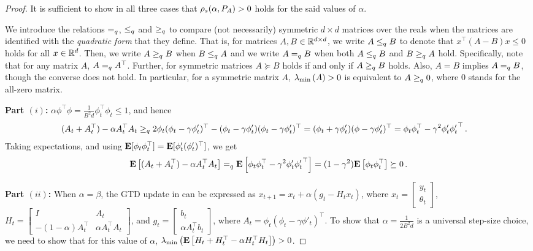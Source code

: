 \thtdadmis*
\begin{proof}
It is sufficient to show in all three cases that $\rho_s(\alpha,P_A)>0$ holds for the said values of $\alpha$. 

We introduce the relations $=_q$, $\leq_q$ and $\geq_q$ to compare (not necessarily) symmetric $d\times d$ matrices
over the reals when the matrices are identified with the \emph{quadratic form} that they define.
That is, for matrices $A, B\in \mathbb{R}^{d \times d}$, we write $A \leq_q B$ to denote that $x^\top (A-B) x \leq 0 $ holds for all $x\in \mathbb{R}^d$. Then, we write $A \geq_q B$ when $B \leq_q A$ and we write $A =_q B$ when both $A \leq_q B$ and $B \geq_q A$ hold. 
Specifically, note that for any matrix $A$, $A=_q A^\top$.
Further, for symmetric matrices $A \succeq B$ holds if and only if $A \geq_q B$ holds. 
Also, $A=B$ implies $A =_q B$, though the converse does not hold.
In particular, for a symmetric matrix $A$, $\lambda_{\min}\left(A\right)>0$ is equivalent to $A \geq_q 0$, where $0$ stands for the all-zero matrix.

\textbf{Part $(i)$:}
$\alpha\phi^\top\phi=\frac{1}{B^2d}\phi^\top_t\phi_t\le 1$, and hence
\begin{align*}
\MoveEqLeft
(A_t+A_t^\top) -\alpha A_t^\top A_t 
\qfgeq 2\phi_t(\phi_t-\gamma\phi'_t)^\top - (\phi_t-\gamma\phi'_t)(\phi_t-\gamma\phi'_t)^\top
=(\phi_t+\gamma\phi'_t)(\phi-\gamma\phi'_t)^\top
=\phi_t\phi_t^\top-\gamma^2\phi'_t{\phi'_t}^\top\,.
\end{align*}
Taking expectations, and using $\mathbf{E}[ \phi_t \phi_t^\top ] = \mathbf{E}[ \phi_t' (\phi_t')^\top ]$, we get
\begin{align*}
\mathbf{E}\left[(A_t+A_t^\top) -\alpha A_t^\top A_t \right] =_q \mathbf{E}\left[\phi_t\phi_t^\top-\gamma^2\phi'_t{\phi'_t}^\top\right]
=(1-\gamma^2)\mathbf{E}\left[\phi_t\phi_t^\top\right]
\succeq 0\,.
\end{align*}

\textbf{Part $(ii)$:}
When $\alpha=\beta$,
the GTD update in  can be expressed as $x_{t+1}=x_t+\alpha (g_t -H_t x_t)$, where $x_t=\left[\begin{matrix}y_t\\\theta_t\end{matrix}\right]$, 
	$H_t=
		\left[\begin{matrix}
			I &A_t \\ 
			-(1-\alpha)A^\top_t & \alpha A_t^\top A_t
		\end{matrix}\right]$, 
and $g_t=\left[\begin{matrix} b_t\\ \alpha A_t^\top b_t\end{matrix}\right]$, where $A_t=\phi_t(\phi_t-\gamma \phi'_t)^\top$. To show that $\alpha=\frac{1}{2B^2 d}$ is a universal step-size choice, 
we need to show that for this value of $\alpha$, 
$\lambda_{\min}\left( \mathbf{E}\left[ H_t + H_t^\top - \alpha H_t^\top H_t \right] \right)>0$.


\end{proof}
